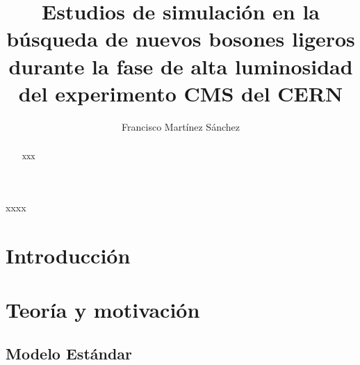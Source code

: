 \documentclass[12pt]{report}
\begin{document}
\title{Estudios de simulación en la búsqueda de nuevos bosones ligeros durante la fase de alta luminosidad del experimento CMS del CERN}
\author{Francisco Martínez Sánchez}
\maketitle
%
\begin{resumen}\thispagestyle{empty}
xxxx
\end{resumen}
\begin{abstract}\thispagestyle{empty}%
xxx
\end{abstract}

\setcounter{page}{1}
\tableofcontents
\clearpage
\listoftables
{}
\clearpage
\listoffigures
{}
\clearpage




\chapter*{Introducción}




\chapter{Teoría y motivación}


	\section{Modelo Estándar} 	
	
\end{document}
